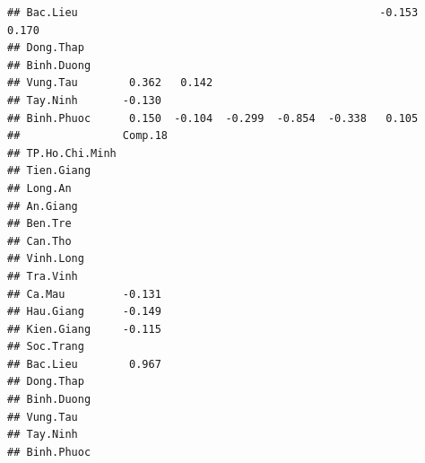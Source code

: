 \documentclass[../thesis.tex]{subfiles}
\begin{document}
\begin{verbatim}
## Bac.Lieu                                               -0.153   0.170         
## Dong.Thap                                                                     
## Binh.Duong                                                                    
## Vung.Tau        0.362   0.142                                                 
## Tay.Ninh       -0.130                                                         
## Binh.Phuoc      0.150  -0.104  -0.299  -0.854  -0.338   0.105                 
##                Comp.18
## TP.Ho.Chi.Minh        
## Tien.Giang            
## Long.An               
## An.Giang              
## Ben.Tre               
## Can.Tho               
## Vinh.Long             
## Tra.Vinh              
## Ca.Mau         -0.131 
## Hau.Giang      -0.149 
## Kien.Giang     -0.115 
## Soc.Trang             
## Bac.Lieu        0.967 
## Dong.Thap             
## Binh.Duong            
## Vung.Tau              
## Tay.Ninh              
## Binh.Phuoc            

\end{verbatim}

\newpage
\end{document}

